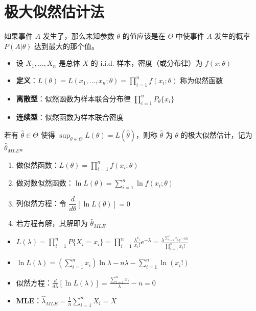 \section{极大似然估计法}
\begin{tipbox}[极大似然思想]
如果事件 $A$ 发生了，那么未知参数 $\theta$ 的值应该是在 $\Theta$ 中使事件 $A$ 发生的概率 $P(A|\theta)$ 达到最大的那个值。
\end{tipbox}

\begin{definition}
\begin{itemize}
	\item 设 $X_1, \ldots, X_n$ 是总体 $X$ 的 i.i.d. 样本，密度（或分布律）为 $f(x;\theta)$
	\item \textbf{定义}：$L(\theta)=L(x_{1}, \ldots, x_{n};\theta)=\prod_{i=1}^{n}f(x_{i};\theta)$ 称为似然函数
	\item \textbf{离散型}：似然函数为样本联合分布律 $\prod_{i=1}^{n}P_{\theta}\{x_{i}\}$
	\item \textbf{连续型}：似然函数为样本联合密度
\end{itemize}
\end{definition}

\begin{definition}
若有 $\hat{\theta} \in \Theta$ 使得 $\sup_{\theta \in \Theta} L(\theta) = L(\hat{\theta})$，则称 $\hat{\theta}$ 为 $\theta$ 的极大似然估计，记为 $\hat{\theta}_{MLE}$。
\end{definition}

\begin{property}
\begin{enumerate}
	\item 做似然函数：$L(\theta)=\prod_{i=1}^{n}f(x_{i};\theta)$
	\item 做对数似然函数：$\ln L(\theta)=\sum_{i=1}^{n}\ln f(x_{i};\theta)$
	\item 列似然方程：令 $\dfrac{d}{d\theta}[\ln L(\theta)]=0$
	\item 若方程有解，其解即为 $\hat{\theta}_{MLE}$
\end{enumerate}
\end{property}

\begin{example}
\begin{itemize}
	\item $L(\lambda)=\prod_{i=1}^{n}P\{X_i=x_i\}=\prod_{i=1}^{n}\frac{\lambda^{x_{i}}}{x_{i}!}e^{-\lambda} = \frac{\lambda^{\sum_{i=1}^{n}x_{i}} e^{-n\lambda}}{\prod_{i=1}^{n}x_{i}!}$
	\item $\ln L(\lambda) = \left(\sum_{i=1}^{n}x_{i}\right)\ln \lambda - n\lambda - \sum_{i=1}^{n}\ln(x_{i}!)$
	\item 似然方程：$\frac{d}{d\lambda}[\ln L(\lambda)] = \frac{\sum_{i=1}^{n}x_{i}}{\lambda} - n = 0$
	\item \textbf{MLE}：$\hat{\lambda}_{MLE} = \frac{1}{n}\sum_{i=1}^{n}X_{i} = \overline{X}$
\end{itemize}
\end{example}

